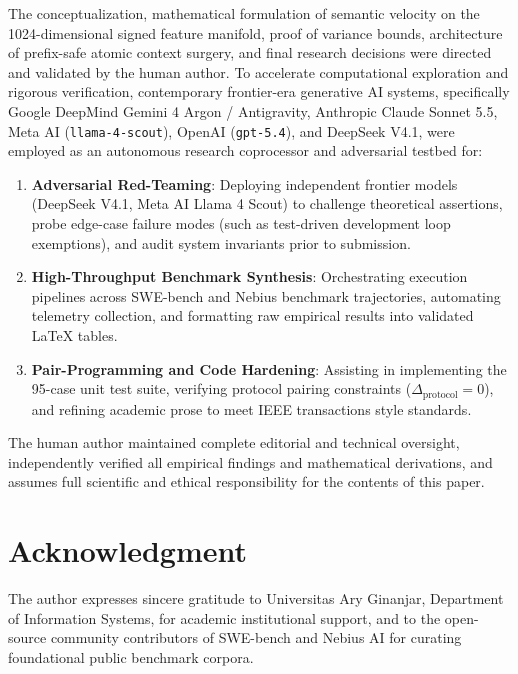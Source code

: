 \documentclass[journal]{IEEEtran}
\begin{document}
The conceptualization, mathematical formulation of semantic velocity on the 1024-dimensional signed feature manifold, proof of variance bounds, architecture of prefix-safe atomic context surgery, and final research decisions were directed and validated by the human author. To accelerate computational exploration and rigorous verification, contemporary frontier-era generative AI systems, specifically Google DeepMind Gemini 4 Argon / Antigravity, Anthropic Claude Sonnet 5.5, Meta AI (\texttt{llama-4-scout}), OpenAI (\texttt{gpt-5.4}), and DeepSeek V4.1, were employed as an autonomous research coprocessor and adversarial testbed for:
\begin{enumerate}[leftmargin=12pt, topsep=2pt, itemsep=1pt]
    \item \textbf{Adversarial Red-Teaming}: Deploying independent frontier models (DeepSeek V4.1, Meta AI Llama 4 Scout) to challenge theoretical assertions, probe edge-case failure modes (such as test-driven development loop exemptions), and audit system invariants prior to submission.
    \item \textbf{High-Throughput Benchmark Synthesis}: Orchestrating execution pipelines across SWE-bench and Nebius benchmark trajectories, automating telemetry collection, and formatting raw empirical results into validated LaTeX tables.
    \item \textbf{Pair-Programming and Code Hardening}: Assisting in implementing the 95-case unit test suite, verifying protocol pairing constraints ($\Delta_{\text{protocol}} = 0$), and refining academic prose to meet IEEE transactions style standards.
\end{enumerate}
The human author maintained complete editorial and technical oversight, independently verified all empirical findings and mathematical derivations, and assumes full scientific and ethical responsibility for the contents of this paper.

\section*{Acknowledgment}
The author expresses sincere gratitude to Universitas Ary Ginanjar, Department of Information Systems, for academic institutional support, and to the open-source community contributors of SWE-bench and Nebius AI for curating foundational public benchmark corpora.



\end{document}
